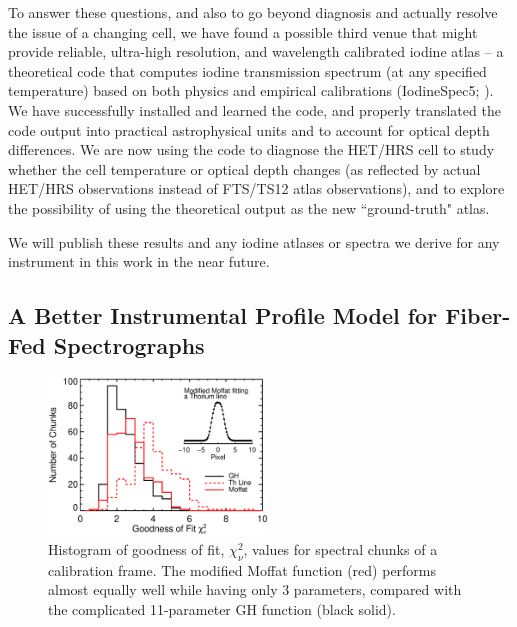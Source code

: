 \documentclass[12pt]{article}
\begin{document}
To answer these questions, and also to go beyond diagnosis and
actually resolve the issue of a changing cell, we have found a
possible third venue that might provide reliable, ultra-high
resolution, and wavelength calibrated iodine atlas -- a theoretical
code that computes iodine transmission spectrum (at any specified
temperature) based on both physics and empirical calibrations
(IodineSpec5; \citealt{iodinespec5}). We have successfully installed and
learned the code, and properly translated the code output into
practical astrophysical units and to account for optical depth
differences. We are now using the code to diagnose the HET/HRS cell to
study whether the cell temperature or optical depth changes (as
reflected by actual HET/HRS observations instead of FTS/TS12 atlas
observations), and to explore the possibility of using the theoretical
output as the new ``ground-truth" atlas.

We will publish these results and any iodine atlases or spectra we
derive for any instrument in this work in the near future.


\vspace{-10pt}
\subsection{A Better Instrumental Profile Model for Fiber-Fed Spectrographs}\label{sec:ip}
\vspace{-5pt}

\begin{figure}
  \vspace{-35pt}
  \begin{center}
    \includegraphics[width=0.52\textwidth]{thar_vs_moffat}
  \end{center}
  \vspace{-25pt}  
  \caption{Histogram of goodness of fit, $\chi_\nu^2$, values for
    spectral chunks of a calibration frame. The modified Moffat
    function (red) performs almost equally well while having only 3
    parameters, compared with the complicated 11-parameter GH function
    (black solid).} 
  \vspace{-8pt}  
  \label{fig:ip}
\end{figure}
\end{document}
